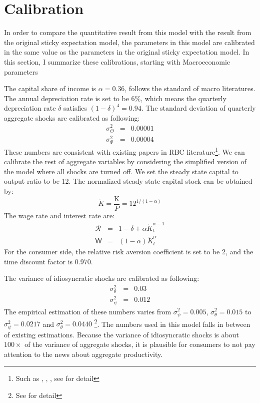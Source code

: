 \documentclass[12pt,letterpaper]{article}
\begin{document}
\section{Calibration}
In order to compare the quantitative result from this model with the result from the original sticky expectation model, the parameters in this model are calibrated in the same value as the parameters in the original sticky expectation model. In this section, I summarize these calibrations, starting with Macroeconomic parameters
\par
The capital share of income is $\alpha=0.36$, follows the standard of macro literatures. The annual depreciation rate is set to be 6\%, which means the quarterly depreciation rate $\delta$ satisfies $(1-\delta)^4=0.94$. The standard deviation of quarterly aggregate shocks are calibrated as following:
\begin{eqnarray}
\sigma^{2}_{\Theta} & = & 0.00001\\
\sigma^{2}_{\Psi} & = & 0.00004 \nonumber
\end{eqnarray}
These numbers are consistent with existing papers in RBC literature\footnote{Such as \cite{ShockStd3}, \cite{ShockStd2}, \cite{ShockStd1}, see \cite{StickyE} for detail}. We can calibrate the rest of aggregate variables by considering the simplified version of the model where all shocks are turned off. We set the steady state capital to output ratio to be 12. The normalized steady state capital stock can be obtained by:
\begin{equation*}
\check{K}=\frac{\pmb{\mathrm{K}}}{P}=12^{1/(1-\alpha)}
\end{equation*}
The wage rate and interest rate are:
\begin{eqnarray}
\mathcal{R} & = & 1-\delta+\alpha\check{K}^{\alpha-1}_{t}\\
\mathsf{W} & = & (1-\alpha)\check{K}^{\alpha}_{t}
\end{eqnarray}
For the consumer side, the relative risk aversion coefficient is set to be 2, and the time discount factor is 0.970.
\par
The variance of idiosyncratic shocks are calibrated as following:
\begin{eqnarray}
\sigma^{2}_{\theta} & = & 0.03\\
\sigma^{2}_{\psi} & = & 0.012 \nonumber
\end{eqnarray}
The empirical estimation of these numbers varies from $\sigma^{2}_{\psi}=0.005$, $\sigma^{2}_{\theta}=0.015$ \cite[]{MicroShockStd4} to $\sigma^{2}_{\psi}=0.0217$ and $\sigma^{2}_{\theta}=0.0440$ \cite[]{MicroShockStd1} \footnote{See \cite{StickyE} for detail}. The numbers used in this model falls in between of existing estimations. Because the variance of idiosyncratic shocks is about $100\times$ of the variance of aggregate shocks, it is plausible for consumers to not pay attention to the news about aggregate productivity.
\end{document}
